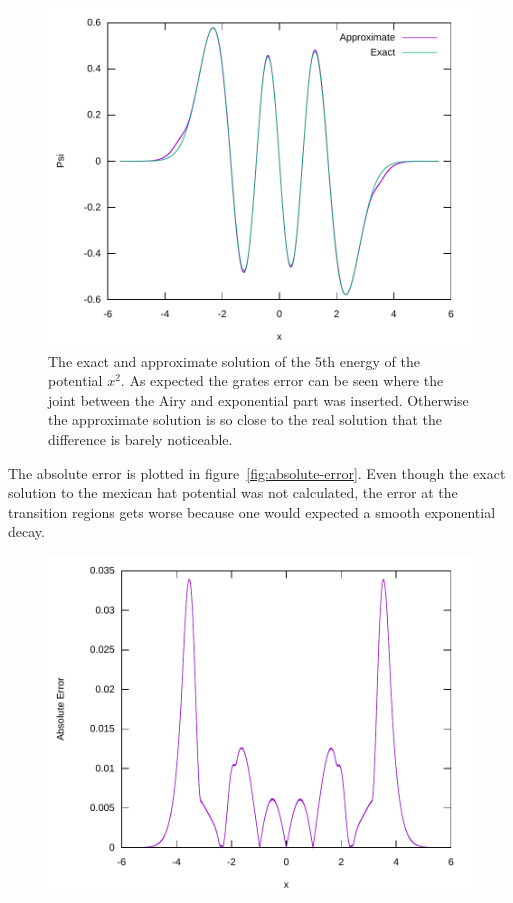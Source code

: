 \documentclass[11pt,DIV=10,final]{scrreprt} %
\begin{document}
{\begin{figure}[H]
  \centering
  \includegraphics[width=\textwidth]{plots/approx_vs_exact_wave_square_5.pdf}
  \caption{\label{fig:approx-vs-exact} The exact and approximate solution of the 5th energy of the potential $x^{2}$. As expected the grates error can be seen where the joint between the Airy and
    exponential part was inserted. Otherwise the approximate solution is so close to the real solution that the difference is barely noticeable.}
\end{figure}
The absolute error is plotted in figure~\ref{fig:absolute-error}. Even though the exact solution to the mexican hat potential was not calculated, the error at the transition regions gets worse because
one would expected a smooth exponential decay.
\begin{figure}[H]
  \centering
  \includegraphics[width=\textwidth]{plots/absolute_error_square_5.pdf}

\end{figure}}
\end{document}

